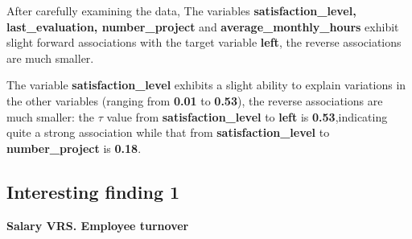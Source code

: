 \documentclass[
  11pt,
]{article}
\newenvironment{Shaded}{\begin{snugshade}}{\end{snugshade}}
\newcommand{\AttributeTok}[1]{\textcolor[rgb]{0.13,0.29,0.53}{#1}}
\newcommand{\CommentTok}[1]{\textcolor[rgb]{0.56,0.35,0.01}{\textit{#1}}}
\newcommand{\FunctionTok}[1]{\textcolor[rgb]{0.13,0.29,0.53}{\textbf{#1}}}
\newcommand{\NormalTok}[1]{#1}
\newcommand{\OtherTok}[1]{\textcolor[rgb]{0.56,0.35,0.01}{#1}}
\newcommand{\SpecialCharTok}[1]{\textcolor[rgb]{0.81,0.36,0.00}{\textbf{#1}}}
\newcommand{\StringTok}[1]{\textcolor[rgb]{0.31,0.60,0.02}{#1}}
\begin{document}
After carefully examining the data, The variables
\textbf{satisfaction\_level, last\_evaluation, number\_project} and
\textbf{average\_monthly\_hours} exhibit slight forward associations
with the target variable \textbf{left}, the reverse associations are
much smaller.

The variable \textbf{satisfaction\_level} exhibits a slight ability to
explain variations in the other variables (ranging from \textbf{0.01} to
\textbf{0.53}), the reverse associations are much smaller: the \(\tau\)
value from \textbf{satisfaction\_level} to \textbf{left} is
\textbf{0.53},indicating quite a strong association while that from
\textbf{satisfaction\_level} to \textbf{number\_project} is
\textbf{0.18}.

\subsection{Interesting finding 1}

\textbf{Salary VRS. Employee turnover}

\begin{Shaded}
\end{Shaded}
\end{document}

